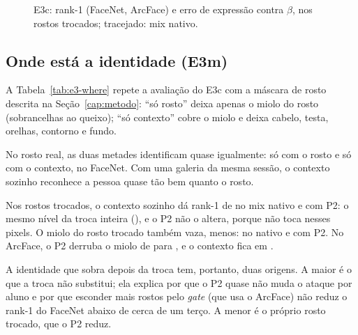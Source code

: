 \begin{table}[ht]\centering
\caption{E3c: força do empurrão, nos rostos trocados.}
\label{tab:e3-p2}

\fonteautor
\end{table}

\begin{figure}[ht]\centering
\caption{E3c: rank-1 (FaceNet, ArcFace) e erro de expressão contra $\beta$, nos rostos trocados; tracejado: mix nativo.}
\label{fig:e3-p2-curve}

\fonteautor
\end{figure}

\subsection{Onde está a identidade (E3m)}
\label{sec:r-onde}

A Tabela~\ref{tab:e3-where} repete a avaliação do E3c com a máscara de rosto descrita na Seção~\ref{cap:metodo}: ``só rosto'' deixa apenas o miolo do rosto (sobrancelhas ao queixo); ``só contexto'' cobre o miolo e deixa cabelo, testa, orelhas, contorno e fundo.

No rosto real, as duas metades identificam quase igualmente:  só com o rosto e  só com o contexto, no FaceNet. Com uma galeria da mesma sessão, o contexto sozinho reconhece a pessoa quase tão bem quanto o rosto.

Nos rostos trocados, o contexto sozinho dá rank-1 de  no mix nativo e  com P2: o mesmo nível da troca inteira (), e o P2 não o altera, porque não toca nesses pixels. O miolo do rosto trocado também vaza, menos:  no nativo e  com P2. No ArcFace, o P2 derruba o miolo de  para , e o contexto fica em .

A identidade que sobra depois da troca tem, portanto, duas origens. A maior é o que a troca não substitui; ela explica por que o P2 quase não muda o ataque por aluno e por que esconder mais rostos pelo \emph{gate} (que usa o ArcFace) não reduz o rank-1 do FaceNet abaixo de cerca de um terço. A menor é o próprio rosto trocado, que o P2 reduz.

